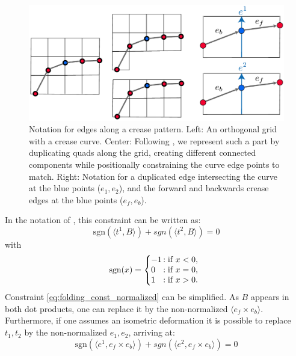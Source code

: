 \begin{figure} [h]
	\centering
	\includegraphics[width=\linewidth]{figures/osc_plane_discretization}
	\caption{Notation for edges along a crease pattern. Left: An orthogonal grid with a crease curve. Center: Following \cite{rabi2018shape}, we represent such a part by duplicating quads along the grid, creating different connected components while positionally constraining the curve edge points to match. Right: Notation for a duplicated edge intersecting the curve at the blue points ($e_1,e_2$), and the forward and backwards crease edges at the blue points ($e_f,e_b$). }
	\label{fig:osc_plane_discretization}
\end{figure}

In the notation of , this constraint can be written as:
\begin{equation} \label{eq:folding_const_normalized} 
\text{sgn}(\langle t^1,B\rangle) +  {sgn}(\langle t^2,B\rangle) = 0
\end{equation}
with 
\begin{equation} \label{eq:sign}
\text{sgn}(x) = \left\{
     \begin{array}{@{}l@{\thinspace}l}
       -1  &: \text{if } x < 0, \\
       0 &: \text{if } x = 0, \\
       1 &: \text{if } x > 0. \\
     \end{array}
   \right.
\end{equation}
 Constraint \eqref{eq:folding_const_normalized} can be simplified. As $B$ appears in both dot products, one can replace it by the non-normalized $\langle e_f \times e_b \rangle$. Furthermore, if one assumes an isometric deformation it is possible to replace $t_1,t_2$ by the non-normalized $e_1,e_2$, arriving at:
\begin{equation} \label{eq:folding_const}
\text{sgn}(\langle e^1,e_f \times e_b \rangle) +  {sgn}(\langle e^2,e_f \times e_b\rangle) = 0
\end{equation}

